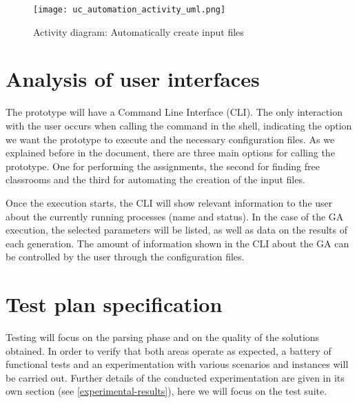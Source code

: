 \begin{figure}[H]
    \caption{Activity diagram: Automatically create input files}
  \centering
  \texttt{[image: uc\_automation\_activity\_uml.png]}
\end{figure}




\section{Analysis of user interfaces}

The prototype will have a Command Line Interface (CLI). The only interaction with the user occurs when calling the command in the shell, indicating the option we want the prototype to execute and the necessary configuration files. As we explained before in the document, there are three main options for calling the prototype. One for performing the assignments, the second for finding free classrooms and the third for automating the creation of the input files.

Once the execution starts, the CLI will show relevant information to the user about the currently running processes (name and status). In the case of the GA execution, the selected parameters will be listed, as well as data on the results of each generation. The amount of information shown in the CLI about the GA can be controlled by the user through the configuration files. 



\section{Test plan specification}

Testing will focus on the parsing phase and on the quality of the solutions obtained. In order to verify that both areas operate as expected, a battery of functional tests and an experimentation with various scenarios and instances will be carried out. Further details of the conducted experimentation are given in its own section (see \ref{experimental-results}), here we will focus on the test suite.


